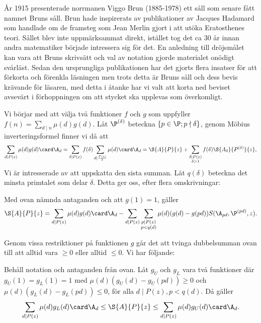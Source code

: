 
År 1915 presenterade norrmanen Viggo Brun (1885-1978) ett såll som senare fått namnet Bruns såll. Brun hade inspirerats av publikationer av Jacques Hadamard som handlade om de framsteg som Jean Merlin gjort i att utöka Eratosthenes teori. Sållet blev inte uppmärksammat direkt, istället tog det ca 30 år innan andra matematiker började intressera sig för det. En anledning till dröjsmålet kan vara att Bruns skrivsätt och val av notation gjorde materialet onödigt svårläst. Sedan den ursprungliga publikationen har det gjorts flera insatser för att förkorta och förenkla läsningen men trots detta är Bruns såll och dess bevis krävande för läsaren, med detta i åtanke har vi valt att korta ned beviset avsevärt i förhoppningen om att stycket ska upplevas som överkomligt.


Vi börjar med att välja två funktioner $f$ och $g$ som uppfyller $f(n) = \sum_{d\mid n} \mu(d) g(d)$. Låt $\P^{(\delta)}$ beteckna $\{ p\in\P;p \nmid \delta\}$,  genom Möbius inverteringsformel finner vi då att
\begin{align*}
    \sum_{d\mid P(z)} \mu(d) g(d) \card\A_d 
    = \sum_{\delta\mid P(z)} f(\delta) \sum_{d\mid \frac{P(z)}{\delta}} \mu(d) \card\A_d 
    = \S{A}{P}{z} + \sum_{\substack{\delta\mid P(z) \\ \delta>1}} f(\delta) \S{A_\delta}{P^{(\delta)}}{z},
\end{align*}
Vi är intresserade av att uppskatta den sista summan. Låt $q(\delta)$ beteckna det minsta primtalet som delar $\delta$. Detta ger oss, efter flera omskrivningar:


\begin{theorem} \label{brun.thm.1}
Med ovan nämnda antaganden och att $g(1)=1$, gäller 
\begin{equation*}
    \S{A}{P}{z} 
    = \sum_{d \mid P(z)} \mu(d) g(d) \card\A_d 
    - \sum_{d \mid P(z)} \sum_{\substack{p \mid P(z) \\ p<q(d)}} \mu(d) (g(d)-g(pd))
    S(\A_{pd},\P^{(pd)},z).      %
\end{equation*}
\end{theorem}

Genom vissa restriktioner på funktionen $g$ går det att tvinga dubbelsumman ovan till att alltid vara $\geq 0$ eller alltid $\leq 0$. Vi har följande:

\begin{theorem} \label{brun.thm.2}
Behåll notation och antaganden från ovan. Låt $g_U$ och $g_L$ vara två funktioner där $g_U(1)=g_L(1)=1$ med $\mu(d)(g_U(d)-g_U(pd)) \geq 0$ och $\mu(d)(g_L(d)-g_L(pd)) \leq 0$, för alla $d \mid P(z), p < q(d)$. Då gäller
\begin{equation}%
    \sum_{d \mid P(z)} \mu(d) g_L(d) \card\A_d 
    \leq \S{A}{P}{z} 
    \leq \sum_{d \mid P(z)} \mu(d) g_U(d) \card\A_d.
\end{equation}
\end{theorem}


